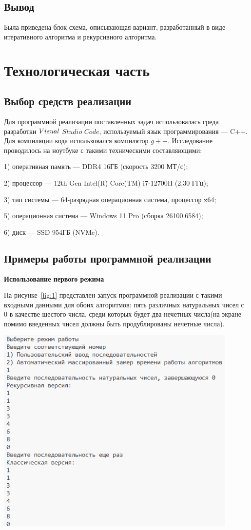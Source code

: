 \documentclass[14pt]{article}
\begin{document}
	\subsection{Вывод}
	Была приведена блок-схема, описывающая вариант, разработанный в виде итеративного алгоритма и рекурсивного алгоритма.
	\newpage
	\section{Технологическая часть} 
	\subsection{Выбор средств реализации}
	Для программной реализации поставленных задач использовалась среда разработки $Vi\-su\-al$ $Studio$ $Code$, используемый язык программирования — C++.
	Для компиляции кода использовался компилятор $g++$.
	Исследование проводилось на ноутбуке с такими техническими составляющими:\par
	1) оперативная память --- DDR4 16ГБ (скорость 3200 МТ/с);\par
	2) процессор --- 12th Gen Intel(R) Core(TM) i7-12700H (2.30 ГГц);\par
	3) тип системы --- 64-разрядная операционная система, процессор x64;\par
	5) операционная система --- Windows 11 Pro (сборка 26100.6584);\par
	6) диск --- SSD 954ГБ (NVMe).\par
	\subsection{Примеры работы программной реализации}
	\textbf{Использование первого режима}\par
	На рисунке~\ref{fig:1} представлен запуск программной реализации с такими входными данными для обоих алгоритмов: пять различных натуральных чисел с 0 в качестве шестого числа, среди которых будет два нечетных числа(на экране помимо введенных чисел должны быть продублированы нечетные числа).
	\begin{center}
		\includegraphics[width = 0.9\textwidth]{example_1.png}
		\label{fig:1}
	\end{center}
	
\end{document}
